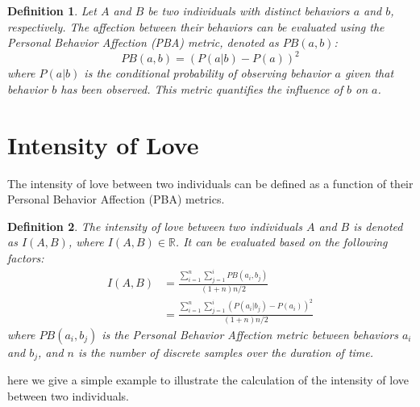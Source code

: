\documentclass{article}
\newtheorem{definition}{Definition}
\begin{document}
\begin{definition}
    Let $A$ and $B$ be two individuals with distinct behaviors $a$ and $b$, respectively. The affection between their behaviors can be evaluated using the Personal Behavior Affection (PBA) metric, denoted as $PB(a, b)$:
    \[
        PB(a, b) = (P(a|b) - P(a))^2
    \]
    where $P(a|b)$ is the conditional probability of observing behavior $a$ given that behavior $b$ has been observed. This metric quantifies the influence of $b$ on $a$.
\end{definition}

\section{Intensity of Love}
The intensity of love between two individuals can be defined as a function of their Personal Behavior Affection (PBA) metrics.

\begin{definition}
    The intensity of love between two individuals $A$ and $B$ is denoted as $I(A, B)$, where $I(A, B) \in \mathbb{R}$. It can be evaluated based on the following factors:
    \begin{equation}
        \begin{split}
            I(A, B) &= \frac{\sum_{i=1}^{n} \sum_{j=1}^{i} PB(a_i, b_j) }{ (1+n)n/2} \\
            &= \frac{\sum_{i=1}^{n} \sum_{j=1}^{i} (P(a_i | b_j) - P(a_i))^2}{(1+n)n/2}
        \end{split}
    \end{equation}
    where $PB(a_i, b_j)$ is the Personal Behavior Affection metric between behaviors $a_i$ and $b_j$, and $n$ is the number of discrete samples over the duration of time.
\end{definition}

here we give a simple example to illustrate the calculation of the intensity of love between two individuals.
\end{document}
